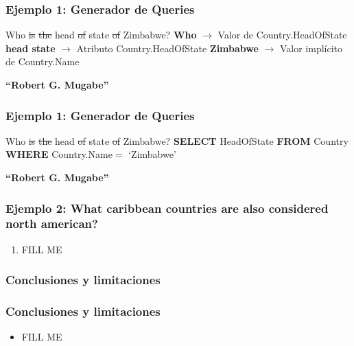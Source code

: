\begin{frame}[t]
\frametitle{Ejemplo 1: Generador de Queries}
\Large{{\color{blue}Who} \st{is} \st{the} {\color{blue}head} \st{of} {\color{blue}state} \st{of} {\color{purple}Zimbabwe}? 
\bigskip
\newline
\textbf{{\color{blue}Who}} $\rightarrow$ Valor de Country.HeadOfState \newline
\textbf{{\color{blue}head state}} $\rightarrow$ Atributo Country.HeadOfState \newline
\textbf{{\color{purple}Zimbabwe}} $\rightarrow$ Valor implícito de Country.Name \newline
}

\bigskip

{\color{white}\textbf{``Robert G. Mugabe''}}

\end{frame}

\begin{frame}[t]
\frametitle{Ejemplo 1: Generador de Queries}
\Large{{\color{blue}Who} \st{is} \st{the} {\color{blue}head} \st{of} {\color{blue}state} \st{of} {\color{purple}Zimbabwe}? 
\bigskip
\newline
\textbf{{\color{purple}SELECT}} HeadOfState \newline
{\color{purple}\textbf{FROM}} Country \newline
{\color{purple}\textbf{WHERE}} Country.Name$=$ {\color{green}`Zimbabwe'}
}

\bigskip

\textbf{``Robert G. Mugabe''}

\end{frame}



\begin{frame}
\frametitle{Ejemplo 2: What caribbean countries are also considered north american?}
  \begin{enumerate}
    \item {\color{red}FILL ME}
  \end{enumerate}
\end{frame}

\subsubsection*{Conclusiones y limitaciones}
\begin{frame}
\frametitle{Conclusiones y limitaciones}
  \begin{itemize}
    \item {\color{red} FILL ME}
  \end{itemize}
\end{frame}
